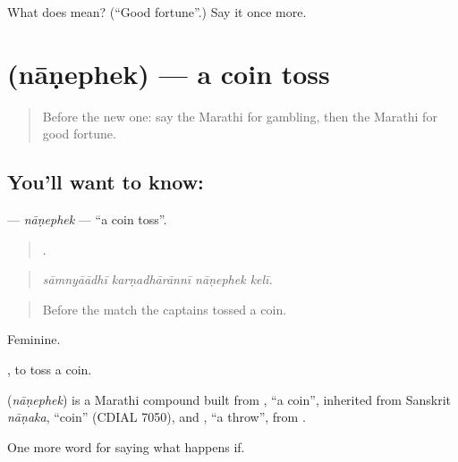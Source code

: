 \begin{tcolorbox}[breakable,colback=teal!4,colframe=teal!35!black,title={Before you move on}]
What does  mean? (\textquotedblleft{}Good fortune\textquotedblright{}.) Say it once more.
\end{tcolorbox}
\section[\texorpdfstring{\mr{नाणेफेक} (nāṇephek)}{नाणेफेक (nāṇephek)}]{ (nāṇephek) — a coin toss}

\label{lesson:MR-C550-nanephek}



\begin{quote}
Before the new one: say the Marathi for gambling, then the Marathi for good fortune.
\end{quote}

\subsection*{You'll want to know: }
\textbf{} — \emph{nāṇephek} — \textquotedblleft{}a coin toss\textquotedblright{}.

\begin{quote}
   .
\end{quote}

\begin{quote}
\emph{sāmnyāādhī karṇadhārānnī nāṇephek kelī.}
\end{quote}

\begin{quote}
Before the match the captains tossed a coin.
\end{quote}

Feminine.

 , to toss a coin.

\begin{cousinweb}
\textbf{} (\emph{nāṇephek}) is a Marathi compound built from , \textquotedblleft{}a coin\textquotedblright{}, inherited from Sanskrit \emph{nāṇaka}, \textquotedblleft{}coin\textquotedblright{} (CDIAL 7050), and , \textquotedblleft{}a throw\textquotedblright{}, from .
\end{cousinweb}

\begin{grammarlens}[title={What you've built}]
One more word for saying what happens if.
\end{grammarlens}

